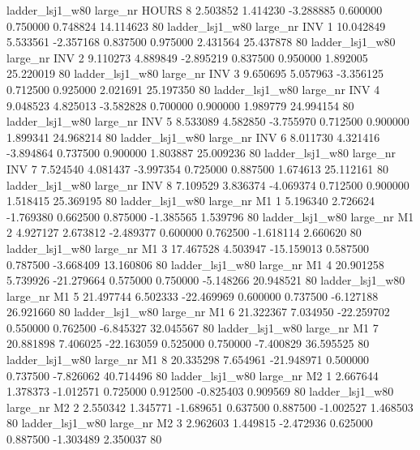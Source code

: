     ladder_lsj1_w80   large_nr    HOURS                 8  2.503852  1.414230  -3.288885 0.600000 0.750000  0.748824   14.114623 80
    ladder_lsj1_w80   large_nr      INV                 1 10.042849  5.533561  -2.357168 0.837500 0.975000  2.431564   25.437878 80
    ladder_lsj1_w80   large_nr      INV                 2  9.110273  4.889849  -2.895219 0.837500 0.950000  1.892005   25.220019 80
    ladder_lsj1_w80   large_nr      INV                 3  9.650695  5.057963  -3.356125 0.712500 0.925000  2.021691   25.197350 80
    ladder_lsj1_w80   large_nr      INV                 4  9.048523  4.825013  -3.582828 0.700000 0.900000  1.989779   24.994154 80
    ladder_lsj1_w80   large_nr      INV                 5  8.533089  4.582850  -3.755970 0.712500 0.900000  1.899341   24.968214 80
    ladder_lsj1_w80   large_nr      INV                 6  8.011730  4.321416  -3.894864 0.737500 0.900000  1.803887   25.009236 80
    ladder_lsj1_w80   large_nr      INV                 7  7.524540  4.081437  -3.997354 0.725000 0.887500  1.674613   25.112161 80
    ladder_lsj1_w80   large_nr      INV                 8  7.109529  3.836374  -4.069374 0.712500 0.900000  1.518415   25.369195 80
    ladder_lsj1_w80   large_nr       M1                 1  5.196340  2.726624  -1.769380 0.662500 0.875000 -1.385565    1.539796 80
    ladder_lsj1_w80   large_nr       M1                 2  4.927127  2.673812  -2.489377 0.600000 0.762500 -1.618114    2.660620 80
    ladder_lsj1_w80   large_nr       M1                 3 17.467528  4.503947 -15.159013 0.587500 0.787500 -3.668409   13.160806 80
    ladder_lsj1_w80   large_nr       M1                 4 20.901258  5.739926 -21.279664 0.575000 0.750000 -5.148266   20.948521 80
    ladder_lsj1_w80   large_nr       M1                 5 21.497744  6.502333 -22.469969 0.600000 0.737500 -6.127188   26.921660 80
    ladder_lsj1_w80   large_nr       M1                 6 21.322367  7.034950 -22.259702 0.550000 0.762500 -6.845327   32.045567 80
    ladder_lsj1_w80   large_nr       M1                 7 20.881898  7.406025 -22.163059 0.525000 0.750000 -7.400829   36.595525 80
    ladder_lsj1_w80   large_nr       M1                 8 20.335298  7.654961 -21.948971 0.500000 0.737500 -7.826062   40.714496 80
    ladder_lsj1_w80   large_nr       M2                 1  2.667644  1.378373  -1.012571 0.725000 0.912500 -0.825403    0.909569 80
    ladder_lsj1_w80   large_nr       M2                 2  2.550342  1.345771  -1.689651 0.637500 0.887500 -1.002527    1.468503 80
    ladder_lsj1_w80   large_nr       M2                 3  2.962603  1.449815  -2.472936 0.625000 0.887500 -1.303489    2.350037 80
